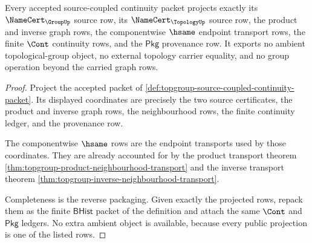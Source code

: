 \begin{theorem}
\label{thm:topgroup-source-coupled-continuity-boundary}
Every accepted source-coupled continuity packet projects exactly its
$\NameCert_{\GroupUp}$ source row, its $\NameCert_{\TopologyUp}$ source row,
the product and inverse graph rows, the componentwise $\hsame$ endpoint
transport rows, the finite $\Cont$ continuity rows, and the $\mathsf{Pkg}$
provenance row. It exports no ambient topological-group object, no external
topology carrier equality, and no group operation beyond the carried graph
rows.
\end{theorem}
\begin{proof}
Project the accepted packet of
\autoref{def:topgroup-source-coupled-continuity-packet}. Its displayed
coordinates are precisely the two source certificates, the product and inverse
graph rows, the neighbourhood rows, the finite continuity ledger, and the
provenance row.

The componentwise $\hsame$ rows are the endpoint transports used by those
coordinates. They are already accounted for by the product transport theorem
\autoref{thm:topgroup-product-neighbourhood-transport} and the inverse
transport theorem \autoref{thm:topgroup-inverse-neighbourhood-transport}.

Completeness is the reverse packaging. Given exactly the projected rows, repack
them as the finite $\mathsf{BHist}$ packet of the definition and attach the
same $\Cont$ and $\mathsf{Pkg}$ ledgers. No extra ambient object is available,
because every public projection is one of the listed rows.
\end{proof}

